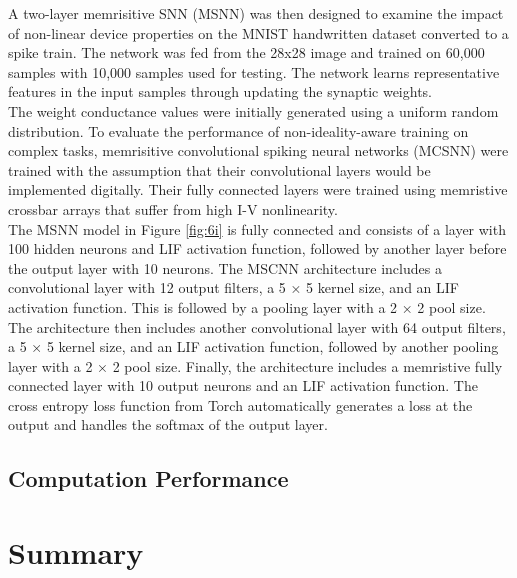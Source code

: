 \noindent A two-layer memrisitive SNN (MSNN) was then designed to examine the impact of non-linear device properties on the MNIST handwritten dataset converted to a spike train.  The network was fed from the 28x28 image and trained on 60,000 samples with 10,000 samples used for testing. The network learns representative features in the input samples through updating the synaptic weights. \\

\noindent The weight conductance values were initially generated using a uniform random distribution. To evaluate the performance of non-ideality-aware training on complex tasks, memrisitive convolutional spiking neural networks (MCSNN) were trained with the assumption that their convolutional layers would be implemented digitally. Their fully connected layers were trained using memristive crossbar arrays that suffer from high I-V nonlinearity. \\

\noindent The MSNN model in Figure \ref{fig:6i} is fully connected and consists of a layer with 100 hidden neurons and LIF activation function, followed by another layer before the output layer with 10 neurons. The MSCNN architecture includes a convolutional layer with 12 output filters, a 5 × 5 kernel size, and an LIF activation function. This is followed by a pooling layer with a 2 × 2 pool size. \\

\noindent The architecture then includes another convolutional layer with 64 output filters, a 5 × 5 kernel size, and an LIF activation function, followed by another pooling layer with a 2 × 2 pool size. Finally, the architecture includes a memristive fully connected layer with 10 output neurons and an LIF activation function. The cross entropy loss function from Torch \cite{eshraghian2023training} automatically generates a loss at the output and handles the softmax of the output layer.

\subsection[Computation Performance]{Computation Performance}


\section[Summary]{Summary}